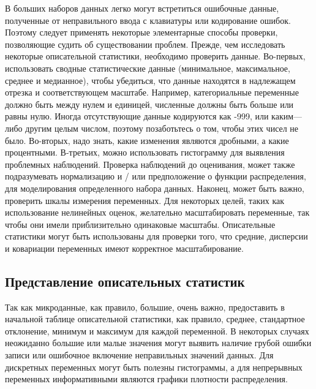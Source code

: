 В больших наборов данных легко могут встретиться ошибочные данные, полученные от неправильного ввода с клавиатуры или кодирование ошибок. Поэтому следует применять некоторые элементарные способы проверки, позволяющие судить об существовании проблем. Прежде, чем исследовать некоторые описательной статистики, необходимо проверить данные. Во-первых, использовать сводные статистические данные (минимальное, максимальное, среднее и медианное), чтобы убедиться, что данные находятся в надлежащем отрезка и соответствующем масштабе. Например, категориальные переменные должно быть между нулем и единицей, численные должны быть больше или равны нулю. Иногда отсутствующие данные кодируются как -999, или каким---либо другим целым числом, поэтому позаботьтесь о том, чтобы этих чисел не было. Во-вторых, надо знать, какие изменения являются дробными, а какие процентными. В-третьих, можно использовать гистограмму для выявления проблемных наблюдений.  Проверка наблюдений до оценивания, может также подразумевать нормализацию и / или предположение о функции распределения, для моделирования определенного набора данных. Наконец, может быть важно, проверить шкалы измерения переменных. Для некоторых целей, таких как использование нелинейных оценок, желательно масштабировать переменные, так чтобы они имели приблизительно одинаковые масштабы. Описательные статистики могут быть использованы для проверки того, что средние, дисперсии и ковариации переменных имеют корректное масштабирование.

\subsection{Представление описательных статистик}

Так как микроданные, как правило, большие, очень важно, предоставить в начальной таблице описательной статистики, как правило, среднее, стандартное отклонение, минимум и максимум для каждой переменной. В некоторых случаях неожиданно большие или малые значения могут выявить наличие грубой ошибки записи или ошибочное включение неправильных значений  данных. Для дискретных переменных могут быть полезны гистограммы, а для непрерывных переменных информативными являются графики плотности распределения.



